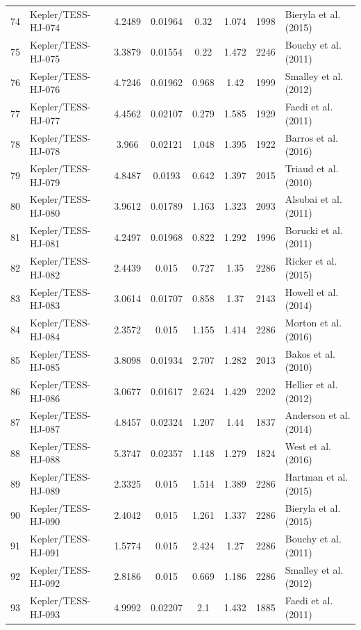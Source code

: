 \begin{longtable}{r l c c c c c p{4.2cm}}
74 & Kepler/TESS-HJ-074 & 4.2489 & 0.01964 & 0.32 & 1.074 & 1998 & Bieryla et al. (2015) \\
75 & Kepler/TESS-HJ-075 & 3.3879 & 0.01554 & 0.22 & 1.472 & 2246 & Bouchy et al. (2011) \\
76 & Kepler/TESS-HJ-076 & 4.7246 & 0.01962 & 0.968 & 1.42 & 1999 & Smalley et al. (2012) \\
77 & Kepler/TESS-HJ-077 & 4.4562 & 0.02107 & 0.279 & 1.585 & 1929 & Faedi et al. (2011) \\
78 & Kepler/TESS-HJ-078 & 3.966 & 0.02121 & 1.048 & 1.395 & 1922 & Barros et al. (2016) \\
79 & Kepler/TESS-HJ-079 & 4.8487 & 0.0193 & 0.642 & 1.397 & 2015 & Triaud et al. (2010) \\
80 & Kepler/TESS-HJ-080 & 3.9612 & 0.01789 & 1.163 & 1.323 & 2093 & Alsubai et al. (2011) \\
81 & Kepler/TESS-HJ-081 & 4.2497 & 0.01968 & 0.822 & 1.292 & 1996 & Borucki et al. (2011) \\
82 & Kepler/TESS-HJ-082 & 2.4439 & 0.015 & 0.727 & 1.35 & 2286 & Ricker et al. (2015) \\
83 & Kepler/TESS-HJ-083 & 3.0614 & 0.01707 & 0.858 & 1.37 & 2143 & Howell et al. (2014) \\
84 & Kepler/TESS-HJ-084 & 2.3572 & 0.015 & 1.155 & 1.414 & 2286 & Morton et al. (2016) \\
85 & Kepler/TESS-HJ-085 & 3.8098 & 0.01934 & 2.707 & 1.282 & 2013 & Bakos et al. (2010) \\
86 & Kepler/TESS-HJ-086 & 3.0677 & 0.01617 & 2.624 & 1.429 & 2202 & Hellier et al. (2012) \\
87 & Kepler/TESS-HJ-087 & 4.8457 & 0.02324 & 1.207 & 1.44 & 1837 & Anderson et al. (2014) \\
88 & Kepler/TESS-HJ-088 & 5.3747 & 0.02357 & 1.148 & 1.279 & 1824 & West et al. (2016) \\
89 & Kepler/TESS-HJ-089 & 2.3325 & 0.015 & 1.514 & 1.389 & 2286 & Hartman et al. (2015) \\
90 & Kepler/TESS-HJ-090 & 2.4042 & 0.015 & 1.261 & 1.337 & 2286 & Bieryla et al. (2015) \\
91 & Kepler/TESS-HJ-091 & 1.5774 & 0.015 & 2.424 & 1.27 & 2286 & Bouchy et al. (2011) \\
92 & Kepler/TESS-HJ-092 & 2.8186 & 0.015 & 0.669 & 1.186 & 2286 & Smalley et al. (2012) \\
93 & Kepler/TESS-HJ-093 & 4.9992 & 0.02207 & 2.1 & 1.432 & 1885 & Faedi et al. (2011) \\

\end{longtable}
